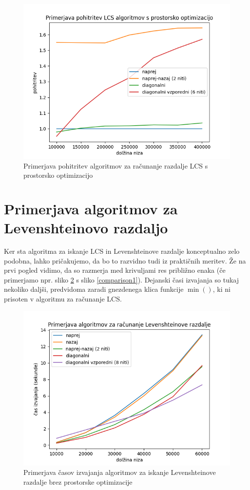 \documentclass[a4paper,12pt,openright]{book}
\begin{document}
\begin{figure}[htb]
\centering
\includegraphics[width=1.0\textwidth]{plots/LCSacceleration.png}
\caption{Primerjava pohitritev algoritmov za računanje razdalje LCS s prostorsko optimizacijo}
\label{comparison31}
\end{figure}



\section{Primerjava algoritmov za Levenshteinovo razdaljo}

Ker sta algoritma za iskanje LCS in Levenshteinove razdalje konceptualno zelo podobna, lahko pričakujemo, da bo to razvidno tudi iz praktičnih meritev. Že na prvi pogled vidimo, da so razmerja med krivuljami res približno enaka (če primerjamo npr. sliko \ref{comparison4} s sliko \ref{comparison1}). Dejanski časi izvajanja so tukaj nekoliko daljši, predvidoma zaradi gnezdenega klica funkcije $\min()$, ki ni prisoten v algoritmu za računanje LCS. 

\begin{figure}[htb]
\centering
\includegraphics[width=1.0\textwidth]{plots/LevenshteinTotal.png}
\caption{Primerjava časov izvajanja algoritmov za iskanje Levenshteinove razdalje brez prostorske optimizacije}
\label{comparison4}
\end{figure}
\end{document}
